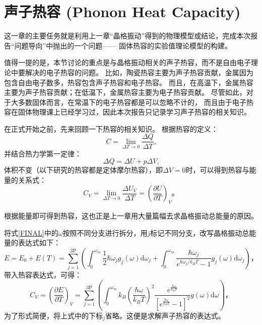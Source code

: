 \documentclass[declarePage]{ecnuthesis}
\begin{document}
\chapter{声子热容 (Phonon Heat Capacity)}
这一章的主要任务就是利用上一章“晶格振动”得到的物理模型或结论，完成本次报告“问题导向”中抛出的一个问题——%
固体热容的实验值理论模型的构建。

值得一提的是，本节讨论的重点是与晶格振动相关的声子热容，而不是自由电子理论中要解决的电子热容的问题。%
比如，陶瓷热容主要为声子热容贡献，金属因为包含自由电子数多，热容包含声子热容和电子热容。%
而且，在高温下，金属热容主要为声子热容贡献；在低温下，金属热容主要为电子热容贡献。\cite{zhihu2}%
尽管如此，对于大多数固体而言，在常温下的电子热容都是可以忽略不计的，%
而且由于电子热容在固体物理课上已经学习过，因此本次报告只记录学习声子热容的相关知识。

在正式开始之前，先来回顾一下热容的相关知识。
根据热容的定义：
\begin{equation}
    C = \lim_{\Delta T \rightarrow 0} \frac{\Delta Q}{\Delta T} \text{,}
\end{equation}
并结合热力学第一定律：
\begin{equation}
    \Delta Q = \Delta U + p \Delta V \text{,}
\end{equation}
体积不变（以下研究的热容都是定体摩尔热容），即$\Delta V = 0$时，可以得到热容与能量的关系式：
\begin{equation}
    C_V = \lim_{\Delta T \rightarrow 0} \frac{\Delta U_V}{\Delta T} = \left( \frac{\partial U}{\partial T} \right) _V \text{。}
\end{equation}

根据能量即可得到热容，这也正是上一章用大量篇幅去求晶格振动总能量的原因。

将式\ref{FINAL}中的$\omega$按照不同分支进行拆分，用$j$标记不同分支，改写晶格振动总能量的表达式如下：
\begin{equation}
    E = E_0 + E(T) = \sum_{j=1}^{3\mathrm{P}}\left(\int_{0}^{\omega_m} \frac{1}{2}\hbar \omega_j g_j(\omega) \mathrm{d}\omega_j + \int_{0}^{\omega_m} \frac{\hbar \omega_j}{e^{\hbar \omega_j / k_B T}-1} g_j(\omega) \mathrm{d}\omega_j\right) \text{，} \label{FINAL2}
\end{equation}
带入热容表达式，可得：
\begin{equation}
    C_V = \left( \frac{\partial E}{\partial T} \right) _V = \sum_{j=1}^{3\mathrm{P}}\left( \int_{0}^{\omega_m} k_B \left( \frac{\hbar \omega}{k_BT}\right) ^2 \frac{e^{\frac{\hbar \omega}{k_BT}}}{\left[e^ \frac{\hbar \omega}{k_BT}-1 \right]^2} g(\omega) \mathrm{d}\omega \right) \text{，} \label{CFI}
\end{equation}
为了形式简便，将上式中的下标$_j$省略。这便是求解声子热容的表达式。
\end{document}
